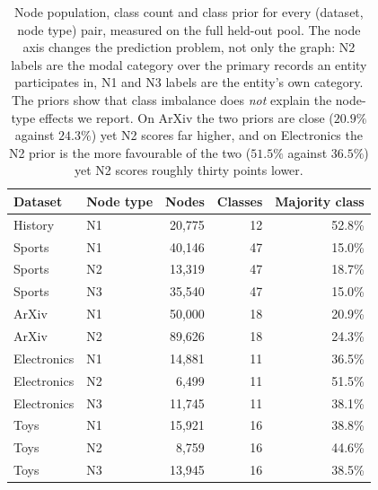 \begin{table}[htbp]
\centering
\small
\caption{Node population, class count and class prior for every (dataset, node
type) pair, measured on the full held-out pool. The node axis changes the
prediction problem, not only the graph: N2 labels are the modal category over
the primary records an entity participates in, N1 and N3 labels are the
entity's own category. The priors show that class imbalance does \emph{not}
explain the node-type effects we report. On ArXiv the two priors are close
($20.9\%$ against $24.3\%$) yet N2 scores far higher, and on Electronics the N2
prior is the more favourable of the two ($51.5\%$ against $36.5\%$) yet N2
scores roughly thirty points lower.}
\label{tab:nodestats}
\vspace{4pt}
\begin{tabular}{llrrr}
\toprule
Dataset & Node type & Nodes & Classes & Majority class \\
\midrule
History & N1 & 20,775 & 12 & 52.8\% \\
Sports & N1 & 40,146 & 47 & 15.0\% \\
Sports & N2 & 13,319 & 47 & 18.7\% \\
Sports & N3 & 35,540 & 47 & 15.0\% \\
ArXiv & N1 & 50,000 & 18 & 20.9\% \\
ArXiv & N2 & 89,626 & 18 & 24.3\% \\
Electronics & N1 & 14,881 & 11 & 36.5\% \\
Electronics & N2 & 6,499 & 11 & 51.5\% \\
Electronics & N3 & 11,745 & 11 & 38.1\% \\
Toys & N1 & 15,921 & 16 & 38.8\% \\
Toys & N2 & 8,759 & 16 & 44.6\% \\
Toys & N3 & 13,945 & 16 & 38.5\% \\
\bottomrule
\end{tabular}
\end{table}
